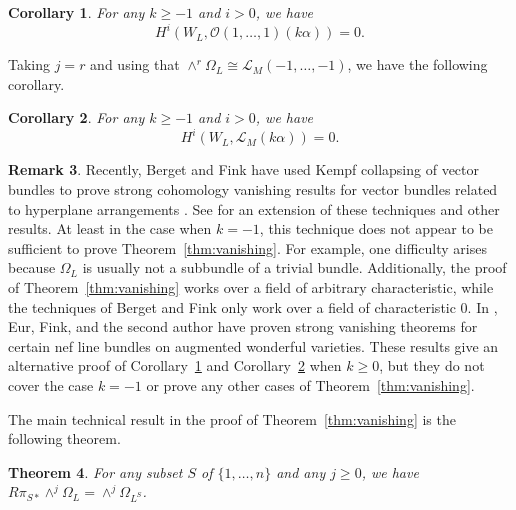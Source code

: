 \documentclass{amsart}
\newtheorem{theorem}{Theorem}[section]
\newtheorem{corollary}[theorem]{Corollary}
\theoremstyle{definition}
\newtheorem{remark}[theorem]{Remark}
\begin{document}
\begin{corollary}\label{cor:line}
For any $k \ge -1$ and $i > 0$, we have 
$$H^i(W_L, \mathcal{O}(1, \dotsc, 1)(k\alpha)) = 0.$$
\end{corollary}

Taking $j = r$ and using that $\wedge^r \Omega_L \cong \mathcal{L}_M(-1, \dotsc, -1)$, we have the following corollary. 

\begin{corollary}\label{cor:LMvanish}
For any $k \ge -1$ and $i > 0$, we have 
$$H^i(W_L, \mathcal{L}_M(k\alpha)) = 0.$$
\end{corollary}


\begin{remark}
Recently, Berget and Fink have used Kempf collapsing of vector bundles 
\cite{Kempf, Weyman} to prove strong cohomology vanishing results for 
vector bundles related to hyperplane arrangements 
\cite{BergetFink,BF24}. See \cite{LiuVanishing} for an extension of 
these techniques and other results. At least in the case when $k=-1$, 
this technique does not appear to be sufficient to prove 
Theorem~\ref{thm:vanishing}. For example, one difficulty arises because $\Omega_L$ is usually not a subbundle of a trivial bundle. Additionally, the proof of Theorem~\ref{thm:vanishing} works over a field of arbitrary characteristic, while the techniques of Berget and Fink only work over a field of characteristic $0$. In \cite{EFL}, Eur, Fink, and the second author have proven strong vanishing theorems for certain nef line bundles on augmented wonderful varieties. These results give an alternative proof of Corollary~\ref{cor:line} and Corollary~\ref{cor:LMvanish} when $k \ge 0$, but they do not cover the case $k=-1$ or prove any other cases of Theorem~\ref{thm:vanishing}. 
\end{remark}


The main technical result in the proof of Theorem~\ref{thm:vanishing} is the following theorem. 

\begin{theorem}\label{thm:pushforward}
For any subset $S$ of $\{1, \dotsc, n\}$ and any $j \ge 0$, we have $R \pi_{S*} \wedge^j \Omega_{L} = \wedge^j \Omega_{L^S}$. 
\end{theorem}
\end{document}
